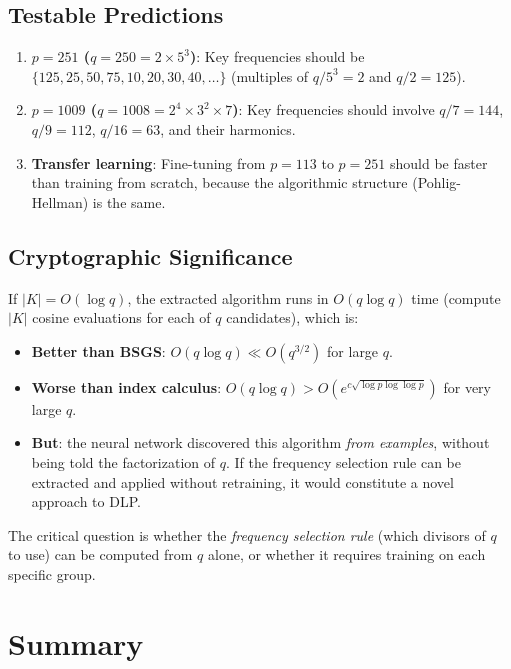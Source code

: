 \documentclass[11pt]{article}
\begin{document}
\subsection{Testable Predictions}

\begin{enumerate}[leftmargin=*]
    \item \textbf{$p = 251$ ($q = 250 = 2 \times 5^3$)}: Key frequencies should be $\{125, 25, 50, 75, 10, 20, 30, 40, \ldots\}$ (multiples of $q/5^3 = 2$ and $q/2 = 125$).
    \item \textbf{$p = 1009$ ($q = 1008 = 2^4 \times 3^2 \times 7$)}: Key frequencies should involve $q/7 = 144$, $q/9 = 112$, $q/16 = 63$, and their harmonics.
    \item \textbf{Transfer learning}: Fine-tuning from $p=113$ to $p=251$ should be faster than training from scratch, because the algorithmic structure (Pohlig-Hellman) is the same.
\end{enumerate}

\subsection{Cryptographic Significance}

If $|K| = O(\log q)$, the extracted algorithm runs in $O(q \log q)$ time (compute $|K|$ cosine evaluations for each of $q$ candidates), which is:
\begin{itemize}[leftmargin=*]
    \item \textbf{Better than BSGS}: $O(q \log q) \ll O(q^{3/2})$ for large $q$.
    \item \textbf{Worse than index calculus}: $O(q \log q) > O(e^{c\sqrt{\log p \log \log p}})$ for very large $q$.
    \item \textbf{But}: the neural network discovered this algorithm \emph{from examples}, without being told the factorization of $q$. If the frequency selection rule can be extracted and applied without retraining, it would constitute a novel approach to DLP.
\end{itemize}

The critical question is whether the \emph{frequency selection rule} (which divisors of $q$ to use) can be computed from $q$ alone, or whether it requires training on each specific group.


\section{Summary}
\end{document}
